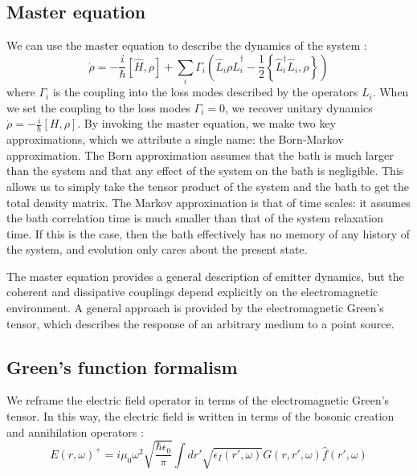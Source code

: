\documentclass{article}
\begin{document}
\subsection{Master equation}
We can use the master equation to describe the dynamics of the system \cite{dzsotjan_quantum_2010,kastel_suppression_2005,meystre_elements_2007}:
\begin{equation}
  \dot{\rho} = -\frac{i}{\hbar}\left[\hat{H}, \rho\right] + \sum_i \Gamma_i\left(\hat{L}_i\rho
    \hat{L}_i^\dagger -
  \frac{1}{2}\left\{\hat{L}_i^\dagger \hat{L}_i, \rho\right\}\right)
\end{equation}
where $\Gamma_i$ is the coupling into the loss modes described by the operators $L_i$.
When we set the coupling to the loss modes $\Gamma_i = 0$, we recover unitary dynamics
$\dot{\rho}=-\frac{i}{\hbar}[H, \rho]$. By invoking the master equation, we make two
key approximations, which we attribute a single name: the Born-Markov approximation.
The Born approximation assumes that the bath is much larger than the system and that
any effect of the system on the bath is negligible. This allows us to simply take the
tensor product of the system and the bath to get the total density matrix. The Markov
approximation is that of time scales: it assumes the bath correlation time is
much smaller than that of the system relaxation time. If this is the case,
then the bath effectively has no memory of any history of the system, and evolution
only cares about the present state.

The master equation provides a general description of emitter dynamics, but the
coherent and dissipative couplings depend explicitly on the electromagnetic
environment. A general approach is provided by the electromagnetic Green's tensor,
which describes the response of an arbitrary medium to a point source.

\subsection{Green's function formalism}
We reframe the electric field operator in terms of the electromagnetic Green's
tensor. In this way, the electric field is written in terms of the bosonic
creation and annihilation operators \cite{gruner_green-function_1996,
asenjo-garcia_atom-light_2017}:
\begin{equation}
  E(r,\omega)^+ = i\mu_0\omega^2\sqrt{\frac{\hbar\epsilon_0}{\pi}}\int
  dr'\sqrt{\epsilon_I(r',\omega)}G(r, r', \omega)\hat{f}(r',\omega)
\end{equation}
\end{document}
